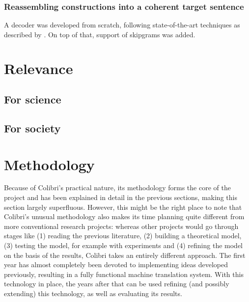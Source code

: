 \documentclass[12pt]{article}
\begin{document}
\subsubsection{Reassembling constructions into a coherent target sentence}
A decoder was developed from scratch, following state-of-the-art techniques as described by \citet{koehn03}. On top of that, support of skipgrams was added.










\section{Relevance}

\subsection{For science}


\subsection{For society}



\section{Methodology}

Because of Colibri's practical nature, its methodology forms the core of the project and has been explained in detail in the previous sections, making this section largely superfluous. However, this might be the right place to note that Colibri's unusual methodology also makes its time planning quite different from more conventional research projects: whereas other projects would go through stages like (1) reading the previous literature, (2) building a theoretical model, (3) testing the model, for example with experiments and (4) refining the model on the basis of the results, Colibri takes an entirely different approach. The first year has almost completely been devoted to implementing ideas developed previously, resulting in a fully functional machine translation system. With this technology in place, the years after that can be used refining (and possibly extending) this technology, as well as evaluating its results.
\end{document}
